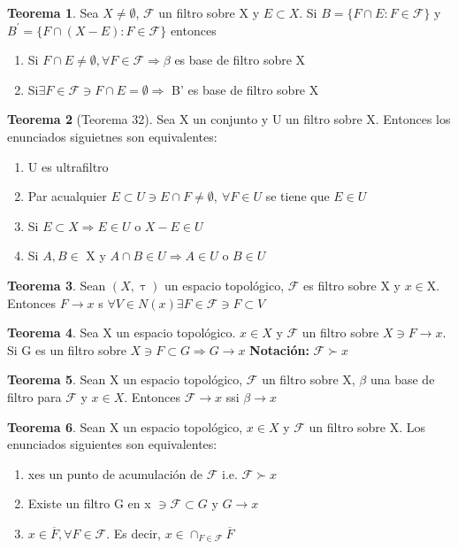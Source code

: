 \documentclass{article}
\theoremstyle{definition}
\newtheorem{theorem}{Teorema}[section]
\begin{document}
\begin{theorem}
	Sea $X\neq\emptyset$, $\mathcal{F}$ un filtro sobre X y $E\subset X$. Si $B=\{F\cap E: F\in \mathcal{F}\}$ 
y $B^{'}=\{F\cap (X-E): F\in \mathcal{F}\}$ entonces 
	\begin{enumerate}
		\item Si $F\cap E\neq \emptyset, \forall F\in \mathcal{F}\Rightarrow \beta$ es base de filtro sobre X
		\item Si$\exists F\in \mathcal{F}\ni F\cap E = \emptyset \Rightarrow$ B' es base de filtro sobre X 
	\end{enumerate}
\end{theorem}
\begin{theorem}[Teorema 32]
	Sea X un conjunto y U un filtro sobre X. Entonces los enunciados siguietnes son equivalentes:
	\begin{enumerate}
		\item U es ultrafiltro
		\item Par acualquier $E\subset U\ni E\cap F\neq \emptyset,\ \forall F\in U$ se tiene que $E\in U$
		\item Si $E\subset X\Rightarrow E\in U$ o $X-E\in U$
		\item Si $A, B\in$ X y $ A\cap B\in U\Rightarrow A\in U$ o $ B\in U$
	\end{enumerate}
\end{theorem}
\begin{theorem}
	Sean $(X,\uptau)$ un espacio topológico, $\mathcal{F}$ es filtro sobre X y $x\in$X. Entonces $F\to x$ s $\forall V\in N(x)\exists F\in\mathcal{F}\ni F\subset V$
\end{theorem}
\begin{theorem}
	Sea X un espacio topológico. $x\in X$ y $\mathcal{F}$ un filtro sobre $X\ni F\to x$. Si G es un filtro sobre $X\ni F\subset G\Rightarrow G\to x$
	\textbf{Notación: } $\mathcal{F} \succ x$
\end{theorem}
\begin{theorem}
	Sean X un espacio topológico, $\mathcal{F}$ un filtro sobre X, $\beta$ una base de filtro para $\mathcal{F}$ y $x\in X$. Entonces $\mathcal{F}\to x$ ssi $\beta \to x$
\end{theorem}
\begin{theorem}
	Sean X un espacio topológico, $x\in X$ y $\mathcal{F}$ un filtro sobre X. Los enunciados siguientes son equivalentes:
	\begin{enumerate}
		\item xes un punto de acumulación de $\mathcal{F}$ i.e. $\mathcal{F} \succ x$
		\item Existe un filtro G en x $\ni\mathcal{F}\subset G$ y $G\to x$
		\item $x\in \overline{F}, \forall F \in \mathcal{F}$. Es decir, $x\in \cap_{F\in\mathcal{F}}\overline{F}$ 
	\end{enumerate}
\end{theorem}
\end{document}
